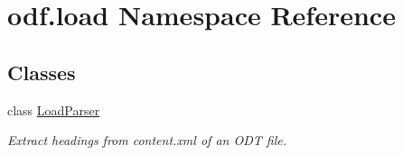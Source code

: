 \hypertarget{namespaceodf_1_1load}{\section{odf.\+load Namespace Reference}
\label{namespaceodf_1_1load}
}
\subsection*{Classes}
\begin{DoxyCompactItemize}
\item 
class \hyperlink{classodf_1_1load_1_1LoadParser}{Load\+Parser}
\begin{DoxyCompactList}\small\item\em Extract headings from content.\+xml of an O\+D\+T file. \end{DoxyCompactList}\end{DoxyCompactItemize}
